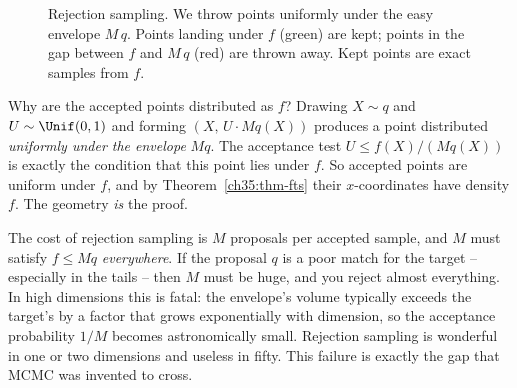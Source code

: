 \begin{figure}[H]
\centering
{}
\caption{Rejection sampling. We throw points uniformly under the easy envelope
$M\,q$. Points landing under $f$ (green) are kept; points in the gap between $f$
and $M\,q$ (red) are thrown away. Kept points are exact samples from $f$.}
\label{ch35:fig-rejection}
\end{figure}

\begin{whybox}
Why are the accepted points distributed as $f$? Drawing $X\sim q$ and
$U\sim\Unif(0,1)$ and forming $(X,\,U\cdot M q(X))$ produces a point distributed
\emph{uniformly under the envelope} $Mq$. The acceptance test $U \le f(X)/(Mq(X))$
is exactly the condition that this point lies under $f$. So accepted points are
uniform under $f$, and by Theorem~\ref{ch35:thm-fts} their $x$-coordinates have
density $f$. The geometry \emph{is} the proof.
\end{whybox}

\begin{trapbox}
The cost of rejection sampling is $M$ proposals per accepted sample, and $M$ must
satisfy $f \le Mq$ \emph{everywhere}. If the proposal $q$ is a poor match for the
target -- especially in the tails -- then $M$ must be huge, and you reject almost
everything. In high dimensions this is fatal: the envelope's volume typically
exceeds the target's by a factor that grows exponentially with dimension, so the
acceptance probability $1/M$ becomes astronomically small. Rejection sampling is
wonderful in one or two dimensions and useless in fifty. This failure is exactly
the gap that MCMC was invented to cross.
\end{trapbox}

